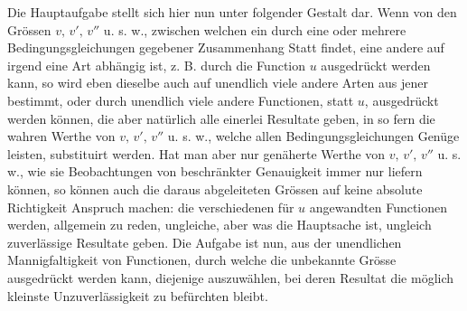Die Hauptaufgabe stellt sich hier nun unter folgender Gestalt dar. Wenn von den Grössen \(v,\,v',\,v''\) u. s. w., zwischen welchen ein durch eine oder mehrere Bedingungsgleichungen gegebener Zusammenhang Statt findet, eine andere auf irgend eine Art abhängig ist, z. B. durch die Function \(u\) ausgedrückt werden kann, so wird eben dieselbe auch auf unendlich viele andere Arten aus jener bestimmt, oder durch unendlich viele andere Functionen, statt \(u\), ausgedrückt werden können, die aber natürlich alle einerlei Resultate geben, in so fern die wahren Werthe von \(v,\,v',\,v''\) u. s. w., welche allen Bedingungsgleichungen Genüge leisten, substituirt werden. Hat man aber nur genäherte Werthe von \(v,\,v',\,v''\) u. s. w., wie sie Beobachtungen von beschränkter Genauigkeit immer nur liefern können, so
können auch die daraus abgeleiteten Grössen auf keine absolute Richtigkeit Anspruch machen: die verschiedenen für \(u\) angewandten Functionen werden, allgemein zu reden, ungleiche, aber was die Hauptsache ist, ungleich zuverlässige Resultate geben. Die Aufgabe ist nun, aus der unendlichen Mannigfaltigkeit von Functionen, durch welche die unbekannte Grösse ausgedrückt werden kann, diejenige auszuwählen, bei deren Resultat die möglich kleinste Unzuverlässigkeit zu befürchten bleibt.

